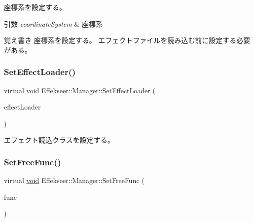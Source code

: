 座標系を設定する。 


\begin{DoxyParams}{引数}
{\em coordinate\+System} & 座標系 \\
\hline
\end{DoxyParams}
\begin{DoxyNote}{覚え書き}
座標系を設定する。 エフェクトファイルを読み込む前に設定する必要がある。 
\end{DoxyNote}
\mbox{\label{class_effekseer_1_1_manager_a1e183d9310c8562279707786e5503f8f}} 
\subsubsection{\texorpdfstring{Set\+Effect\+Loader()}{SetEffectLoader()}}
{\footnotesize\ttfamily virtual \mbox{\hyperlink{namespace_effekseer_ab34c4088e512200cf4c2716f168deb56}{void}} Effekseer\+::\+Manager\+::\+Set\+Effect\+Loader (\begin{DoxyParamCaption}\item[{\mbox{\hyperlink{class_effekseer_1_1_effect_loader}{Effect\+Loader}} $\ast$}]{effect\+Loader }\end{DoxyParamCaption})\hspace{0.3cm}{\ttfamily [pure virtual]}}



エフェクト読込クラスを設定する。 

\mbox{\label{class_effekseer_1_1_manager_a81402561ce17b0d4c681811affbd7340}} 
\subsubsection{\texorpdfstring{Set\+Free\+Func()}{SetFreeFunc()}}
{\footnotesize\ttfamily virtual \mbox{\hyperlink{namespace_effekseer_ab34c4088e512200cf4c2716f168deb56}{void}} Effekseer\+::\+Manager\+::\+Set\+Free\+Func (\begin{DoxyParamCaption}\item[{Free\+Func}]{func }\end{DoxyParamCaption})\hspace{0.3cm}{\ttfamily [pure virtual]}}



